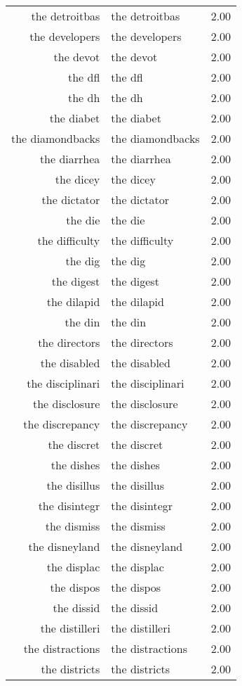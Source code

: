 \begin{table}[ht]
\begin{tabular}{rlr}
  the detroitbas & the detroitbas & 2.00 \\ 
  the developers & the developers & 2.00 \\ 
  the devot & the devot & 2.00 \\ 
  the dfl & the dfl & 2.00 \\ 
  the dh & the dh & 2.00 \\ 
  the diabet & the diabet & 2.00 \\ 
  the diamondbacks & the diamondbacks & 2.00 \\ 
  the diarrhea & the diarrhea & 2.00 \\ 
  the dicey & the dicey & 2.00 \\ 
  the dictator & the dictator & 2.00 \\ 
  the die & the die & 2.00 \\ 
  the difficulty & the difficulty & 2.00 \\ 
  the dig & the dig & 2.00 \\ 
  the digest & the digest & 2.00 \\ 
  the dilapid & the dilapid & 2.00 \\ 
  the din & the din & 2.00 \\ 
  the directors & the directors & 2.00 \\ 
  the disabled & the disabled & 2.00 \\ 
  the disciplinari & the disciplinari & 2.00 \\ 
  the disclosure & the disclosure & 2.00 \\ 
  the discrepancy & the discrepancy & 2.00 \\ 
  the discret & the discret & 2.00 \\ 
  the dishes & the dishes & 2.00 \\ 
  the disillus & the disillus & 2.00 \\ 
  the disintegr & the disintegr & 2.00 \\ 
  the dismiss & the dismiss & 2.00 \\ 
  the disneyland & the disneyland & 2.00 \\ 
  the displac & the displac & 2.00 \\ 
  the dispos & the dispos & 2.00 \\ 
  the dissid & the dissid & 2.00 \\ 
  the distilleri & the distilleri & 2.00 \\ 
  the distractions & the distractions & 2.00 \\ 
  the districts & the districts & 2.00 \\ 

\end{tabular}
\end{table}
